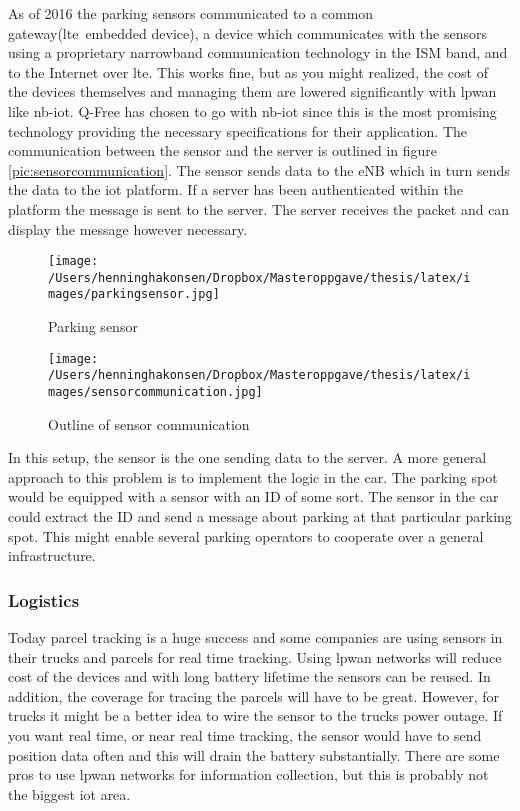 \documentclass[USenglish]{ifimaster}  %
\begin{document}
As of 2016 the parking sensors communicated to a common gateway(\acrshort{lte} embedded device), a device which communicates with the sensors using a proprietary narrowband communication technology in the ISM band, and to the Internet over \acrshort{lte}. This works fine, but as you might realized, the cost of the devices themselves and managing them are lowered significantly with \acrshort{lpwan} like \acrshort{nb-iot}. Q-Free has chosen to go with \acrshort{nb-iot} since this is the most promising technology providing the necessary specifications for their application. The communication between the sensor and the server is outlined in figure \vref{pic:sensorcommunication}. The sensor sends data to the eNB which in turn sends the data to the \acrshort{iot} platform. If a server has been authenticated within the platform the message is sent to the server. The server receives the packet and can display the message however necessary.

\begin{figure}[H]
  \centering\texttt{[image: /Users/henninghakonsen/Dropbox/Masteroppgave/thesis/latex/images/parkingsensor.jpg]}
  \caption{Parking sensor  \cite{person:ola}}
  \label{pic:parkingsensor}
\end{figure}

\begin{figure}[H]
  \centering\texttt{[image: /Users/henninghakonsen/Dropbox/Masteroppgave/thesis/latex/images/sensorcommunication.jpg]}
  \caption{Outline of sensor communication \cite{person:ola}}
  \label{pic:sensorcommunication}
\end{figure}

In this setup, the sensor is the one sending data to the server. A more general approach to this problem is to implement the logic in the car. The parking spot would be equipped with a sensor with an ID of some sort. The sensor in the car could extract the ID and send a message about parking at that particular parking spot. This might enable several parking operators to cooperate over a general infrastructure.

\subsubsection{Logistics}
Today parcel tracking is a huge success and some companies are using sensors in their trucks and parcels for real time tracking. Using \acrshort{lpwan} networks will reduce cost of the devices and with long battery lifetime the sensors can be reused. In addition, the coverage for tracing the parcels will have to be great. However, for trucks it might be a better idea to wire the sensor to the trucks power outage. If you want real time, or near real time tracking, the sensor would have to send position data often and this will drain the battery substantially. There are some pros to use \acrshort{lpwan} networks for information collection, but this is probably not the biggest \acrshort{iot} area.
\end{document}
